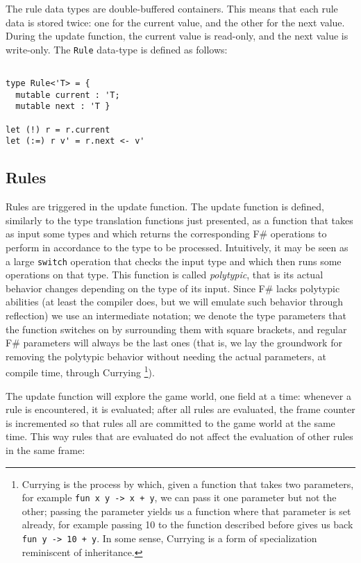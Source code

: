 The rule data types are double-buffered containers. This means that each rule data is stored twice: one for the current value, and the other for the next value. During the update function, the current value is read-only, and the next value is write-only. The \texttt{Rule} data-type is defined as follows:

\begin{lstlisting}

type Rule<'T> = { 
  mutable current : 'T; 
  mutable next : 'T }

let (!) r = r.current
let (:=) r v' = r.next <- v'
\end{lstlisting}


\subsection{Rules}
Rules are triggered in the update function. The update function is defined, similarly to the type translation functions just presented, as a function that takes as input some types and which returns the corresponding F\# operations to perform in accordance to the type to be processed. Intuitively, it may be seen as a large \texttt{switch} operation that checks the input type and which then runs some operations on that type. This function is called \textit{polytypic}, that is its actual behavior changes depending on the type of its input. Since F\# lacks polytypic abilities (at least the compiler does, but we will emulate such behavior through reflection) we use an intermediate notation; we denote the type parameters that the function switches on by surrounding them with square brackets, and regular F\# parameters will always be the last ones (that is, we lay the groundwork for removing the polytypic behavior without needing the actual parameters, at compile time, through Currying \footnote{Currying is the process by which, given a function that takes two parameters, for example \texttt{fun x y -> x + y}, we can pass it one parameter but not the other; passing the parameter yields us a function where that parameter is set already, for example passing 10 to the function described before gives us back \texttt{fun y -> 10 + y}. In some sense, Currying is a form of specialization reminiscent of inheritance.}).

The update function will explore the game world, one field at a time: whenever a rule is encountered, it is evaluated; after all rules are evaluated, the frame counter is incremented so that rules all are committed to the game world at the same time. This way rules that are evaluated do not affect the evaluation of other rules in the same frame:

